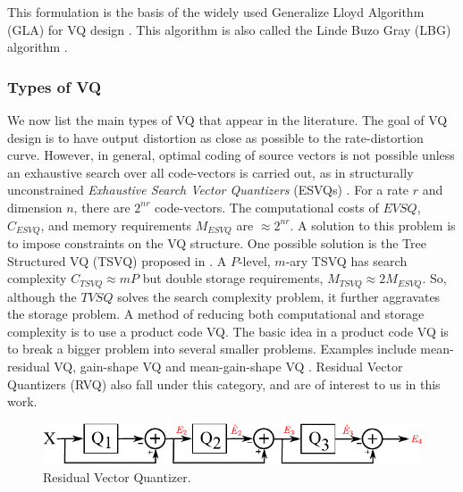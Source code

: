 \documentclass[12pt,letterpaper,doublespaced,ETD,proposal]{gt-ece-thesis}
\begin{document}
\begin{Body}
This formulation is the basis of the widely used Generalize Lloyd Algorithm (GLA) for VQ design \cite{1991_BOOK_VQ_GershoGray}.  This algorithm is also called the Linde Buzo Gray (LBG) algorithm \cite{1982_JNL_LeastSquaresQuantization_Lloyd}.

\subsubsection{Types of VQ}
We now list the main types of VQ that appear in the literature.  The goal of VQ design is to have output distortion as close as possible to the rate-distortion curve.  However, in general, optimal coding of source vectors is not possible unless an exhaustive search over all code-vectors is carried out, as in structurally unconstrained \emph{Exhaustive Search Vector Quantizers} (ESVQs) \cite{1992_JNL_RVQ_Barnes}.  For a rate $r$ and dimension $n$, there are $2^{nr}$ code-vectors.  The computational costs of $EVSQ$, $C_{ESVQ}$, and memory requirements $M_{ESVQ}$ are $\approx 2^{nr}$.  A solution to this problem is to impose constraints on the VQ structure.  One possible solution is the Tree Structured VQ (TSVQ) proposed in \cite{1980_JNL_TSVQ_Buzo}.  A $P$-level, $m$-ary TSVQ has search complexity $C_{TSVQ} \approx mP$ but double storage requirements, $M_{TSVQ} \approx 2 M_{ESVQ}$.   So, although the $TVSQ$ solves the search complexity problem, it further aggravates the storage problem.  A method of reducing both computational and storage complexity is to use a product code VQ.  The basic idea in a product code VQ is to break a bigger problem into several smaller problems.  Examples include mean-residual VQ, gain-shape VQ and mean-gain-shape VQ \cite{1996_JNL_AdvancesRVQ_Barnes}.  Residual Vector Quantizers (RVQ) also fall under this category, and are of interest to us in this work.
 
			\begin{figure}		
					\centering		
					\includegraphics[width=1.0\textwidth]{figs/Proposal_fig1_RVQ_blockDiagram}
					\caption{Residual Vector Quantizer.}
					\label{fig:RVQ_blockDiagram}
			\end{figure}
			

\end{Body}
\end{document}
